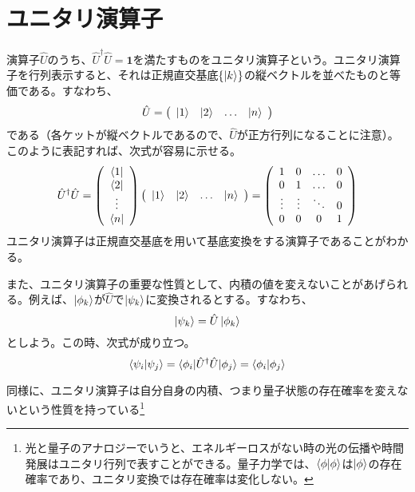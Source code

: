 \section{ユニタリ演算子}
演算子$\hat U$のうち、$\hat U^\dagger \hat U = \pmb 1$を満たすものをユニタリ演算子という。ユニタリ演算子を行列表示すると、それは正規直交基底$\{\ket k\}$の縦ベクトルを並べたものと等価である。すなわち、
\begin{equation}
  \hat U = \left( \begin{array}{cccc} \ket 1 & \ket 2 & \hdots & \ket n \end{array} \right)
\end{equation}
である（各ケットが縦ベクトルであるので、$\hat U$が正方行列になることに注意）。このように表記すれば、次式が容易に示せる。
\begin{equation}
	\hat U ^\dagger \hat U = \left( \begin{array}{c} \bra 1 \\ \bra 2 \\ \vdots \\ \bra n \end{array}\right) 
 		\left( \begin{array}{cccc} \ket 1 & \ket 2 & \hdots & \ket n \end{array} \right) = \left(\begin{array}{cccc}
			1 & 0 & \hdots & 0\\
			0 & 1 & \hdots & 0\\
			\vdots & \vdots & \ddots & 0\\ 
			0 & 0 & 0 & 1
 		\end{array}	\right)
\end{equation}
ユニタリ演算子は正規直交基底を用いて基底変換をする演算子であることがわかる。

また、ユニタリ演算子の重要な性質として、内積の値を変えないことがあげられる。例えば、$\ket{\phi_k}$が$\hat U$で$\ket{\psi_k}$に変換されるとする。すなわち、
\begin{equation}
  \ket{\psi_k} = \hat U \ket{\phi_k}
\end{equation}
としよう。この時、次式が成り立つ。
\begin{equation}
  \braket {\psi_i|\psi_j} = \braket{\phi_i|\hat U^\dagger \hat U | \phi_j} = \braket{\phi_i|\phi_j}
\end{equation}

同様に、ユニタリ演算子は自分自身の内積、つまり量子状態の存在確率を変えないという性質を持っている\footnote{光と量子のアナロジーでいうと、エネルギーロスがない時の光の伝播や時間発展はユニタリ行列で表すことができる。量子力学では、$\braket{\phi|\phi}$は$\ket \phi$の存在確率であり、ユニタリ変換では存在確率は変化しない。}

